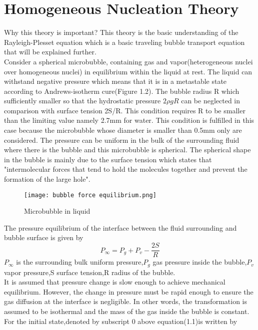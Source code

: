  \section{Homogeneous Nucleation Theory}
 Why this theory is important?
 This theory is the basic understanding of the Rayleigh-Plesset equation which is a basic traveling bubble transport equation that will be explained further.\\
 Consider a spherical microbubble, containing gas and vapor(heterogeneous nuclei over homogeneous nuclei) in equilibrium within the liquid at rest. The liquid can withstand negative pressure which means 
 that it is in a metastable state according to Andrews-isotherm cure(Figure 1.2). The bubble radius R which sufficiently smaller so that the hydrostatic pressure $2\rho gR$ can be neglected in comparison with 
 surface tension 2S/R. This condition requires R to be smaller than the limiting value namely 2.7mm for water. This condition is fulfilled in this case because the microbubble whose diameter is smaller than 0.5mm
 only are considered. The pressure can be uniform in the bulk of the surrounding fluid where there is the bubble and this microbubble is spherical. The spherical shape in the bubble is mainly due to
 the surface tension which states that "intermolecular forces that tend to hold the molecules together and prevent the formation of the large hole".\\
 \begin{figure}[H]
    \centering
    \texttt{[image: bubble force equilibrium.png]}
    \caption{Microbubble in liquid}
    \label{fig:fig3}
\end{figure}
The pressure equilibrium of the interface between the fluid surrounding and bubble surface is given by\\
   \begin{equation}
      P_{\infty} =P_g + P_v -\frac{2S}{R}
      \end{equation}
      ${P_\infty}$ is the surrounding bulk uniform pressure,$P_g$ gas pressure inside the bubble,$P_v$vapor pressure,S surface tension,R radius of the bubble.\\
  It is assumed that pressure change is slow enough to achieve mechanical equilibrium. However, the change in pressure must be rapid enough to ensure the gas diffusion at the interface is negligible.
  In other words, the transformation is assumed to be isothermal and the mass of the gas inside the bubble is constant.\\
  For the initial state,denoted by subscript 0 above equation(1.1)is written by
